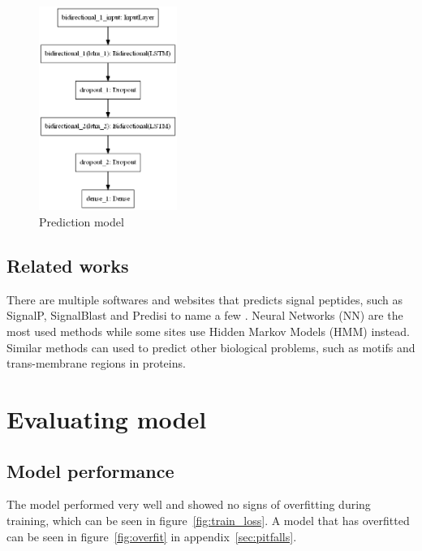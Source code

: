 \begin{figure}[H]
\centering
\includegraphics[width=0.4\textwidth]{pictures/model.png}
\caption{\label{fig:model_fig}Prediction model}
\end{figure}


\subsection{Related works}

There are multiple softwares and websites that predicts signal peptides, such as SignalP, SignalBlast and Predisi to name a few \cite{sp_predict1} \cite{sp_predict2} \cite{sp_predict3}. Neural Networks (NN) are the most used methods while some sites use Hidden Markov Models (HMM) instead. Similar methods can used to predict other biological problems, such as motifs and trans-membrane regions in proteins.


\section{Evaluating model}

\subsection{Model performance}

The model performed very well and showed no signs of overfitting during training, which can be seen in figure~\ref{fig:train_loss}. A model that has overfitted can be seen in figure~\ref{fig:overfit} in appendix~\ref{sec:pitfalls}.

